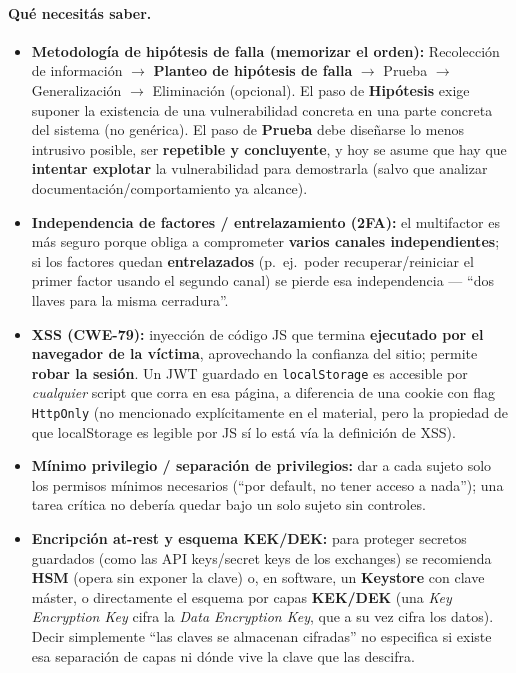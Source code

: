 \paragraph{Qué necesitás saber.}
\begin{itemize}
  \item \textbf{Metodología de hipótesis de falla (memorizar el orden):} Recolección de
  información $\to$ \textbf{Planteo de hipótesis de falla} $\to$ Prueba $\to$ Generalización
  $\to$ Eliminación (opcional). El paso de \textbf{Hipótesis} exige suponer la existencia de
  una vulnerabilidad concreta en una parte concreta del sistema (no genérica). El paso de
  \textbf{Prueba} debe diseñarse lo menos intrusivo posible, ser \textbf{repetible y
  concluyente}, y hoy se asume que hay que \textbf{intentar explotar} la vulnerabilidad para
  demostrarla (salvo que analizar documentación/comportamiento ya alcance).
  \item \textbf{Independencia de factores / entrelazamiento (2FA):} el multifactor es más
  seguro porque obliga a comprometer \textbf{varios canales independientes}; si los factores
  quedan \textbf{entrelazados} (p.\ ej.\ poder recuperar/reiniciar el primer factor usando el
  segundo canal) se pierde esa independencia --- ``dos llaves para la misma cerradura''.
  \item \textbf{XSS (CWE-79):} inyección de código JS que termina \textbf{ejecutado por el
  navegador de la víctima}, aprovechando la confianza del sitio; permite \textbf{robar la
  sesión}. Un JWT guardado en \texttt{localStorage} es accesible por \emph{cualquier} script
  que corra en esa página, a diferencia de una cookie con flag \texttt{HttpOnly} (no
  mencionado explícitamente en el material, pero la propiedad de que localStorage es legible
  por JS sí lo está vía la definición de XSS).
  \item \textbf{Mínimo privilegio / separación de privilegios:} dar a cada sujeto solo los
  permisos mínimos necesarios (``por default, no tener acceso a nada''); una tarea crítica no
  debería quedar bajo un solo sujeto sin controles.
  \item \textbf{Encripción at-rest y esquema KEK/DEK:} para proteger secretos guardados
  (como las API keys/secret keys de los exchanges) se recomienda \textbf{HSM} (opera sin
  exponer la clave) o, en software, un \textbf{Keystore} con clave máster, o directamente el
  esquema por capas \textbf{KEK/DEK} (una \emph{Key Encryption Key} cifra la \emph{Data
  Encryption Key}, que a su vez cifra los datos). Decir simplemente ``las claves se
  almacenan cifradas'' no especifica si existe esa separación de capas ni dónde vive la
  clave que las descifra.
\end{itemize}

